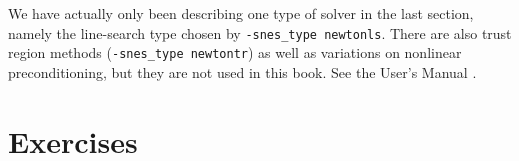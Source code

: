 We have actually only been describing one type of \pSNES solver in the last section, namely the line-search \pSNES type chosen by \texttt{-snes\_type newtonls}.  There are also trust region methods \citep{NocedalWright2006} (\texttt{-snes\_type newtontr}) as well as variations on nonlinear preconditioning, but they are not used in this book.  See the \PETSc User's Manual \citep{petsc-user-ref}.


\section{Exercises}

